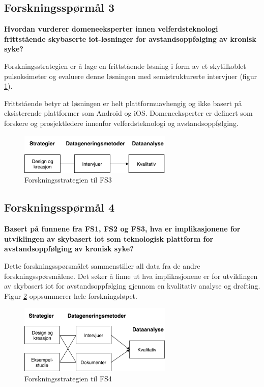 \subsection{Forskningsspørmål 3}
\textbf{Hvordan vurderer domeneeksperter innen velferdsteknologi frittstående skybaserte \gls{iot}-løsninger for avstandsoppfølging av kronisk syke?}

Forskningsstrategien er å lage en frittstående løsning i form av et skytilkoblet pulsoksimeter og evaluere denne løsningen med semistrukturerte intervjuer
(figur \ref{fig:oates_fs3}).
 
Frittstående betyr at løsningen er helt plattformuavhengig og ikke basert på eksisterende plattformer som Android og iOS.
Domeneeksperter er definert som forskere og prosjektledere innenfor velferdsteknologi og avstandsoppfølging.

\begin{figure}
\centering
\includegraphics[width=0.65\textwidth]{fig/oates/fs3}
\caption{Forskningsstrategien til FS3}
\label{fig:oates_fs3}
\end{figure}

\subsection{Forskningsspørmål 4}
\textbf{Basert på funnene fra FS1, FS2 og FS3, hva er implikasjonene for utviklingen av skybasert \gls{iot} som teknologisk plattform
    for avstandsoppfølging av kronisk syke?}

Dette forskningsspørsmålet sammenstiller all data fra de andre forskningsspørsmålene. Det søker å finne ut hva implikasjonene er for utviklingen av
skybasert \gls{iot} for avstandsoppfølging gjennom en kvalitativ analyse og drøfting. Figur \ref{fig:oates_fs4} oppsummerer hele forskningsløpet.

\begin{figure}
\centering
\includegraphics[width=0.65\textwidth]{fig/oates/fs4}
\caption{Forskningsstrategien til FS4}
\label{fig:oates_fs4}
\end{figure}

